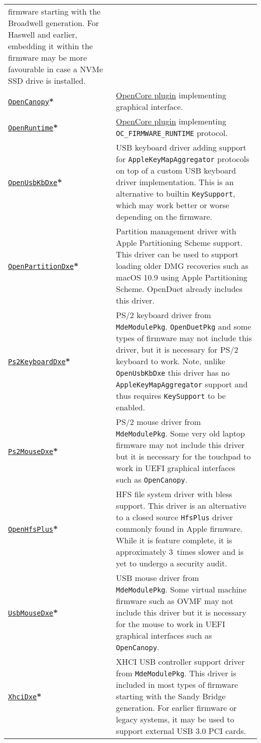 \documentclass[]{article}
\begin{document}
\begin{tabular}{p{1.3in}p{5.55in}}
  firmware starting with the Broadwell generation. For Haswell and earlier, embedding it
  within the firmware may be more favourable in case a NVMe SSD drive is installed. \\
\href{https://github.com/acidanthera/OpenCorePkg}{\texttt{OpenCanopy}}\textbf{*}
& \hyperref[ueficanopy]{OpenCore plugin} implementing graphical interface. \\
\href{https://github.com/acidanthera/OpenCorePkg}{\texttt{OpenRuntime}}\textbf{*}
& \hyperref[uefiruntime]{OpenCore plugin} implementing \texttt{OC\_FIRMWARE\_RUNTIME} protocol. \\
\href{https://github.com/acidanthera/OpenCorePkg}{\texttt{OpenUsbKbDxe}}\textbf{*}
& USB keyboard driver adding support for \texttt{AppleKeyMapAggregator} protocols
  on top of a custom USB keyboard driver implementation. This is an alternative to
  builtin \texttt{KeySupport}, which may work better or worse depending on the firmware. \\
\href{https://github.com/acidanthera/OcBinaryData}{\texttt{OpenPartitionDxe}}\textbf{*}
& Partition management driver with Apple Partitioning Scheme support.
  This driver can be used to support loading older DMG recoveries such as
  macOS 10.9 using Apple Partitioning Scheme. OpenDuet already includes this driver. \\
\href{https://github.com/acidanthera/audk}{\texttt{Ps2KeyboardDxe}}\textbf{*}
& PS/2 keyboard driver from \texttt{MdeModulePkg}. \texttt{OpenDuetPkg} and some types of firmware
  may not include this driver, but it is necessary for PS/2 keyboard to work.
  Note, unlike \texttt{OpenUsbKbDxe} this driver has no \texttt{AppleKeyMapAggregator}
  support and thus requires \texttt{KeySupport} to be enabled. \\
\href{https://github.com/acidanthera/audk}{\texttt{Ps2MouseDxe}}\textbf{*}
& PS/2 mouse driver from \texttt{MdeModulePkg}. Some very old laptop firmware
  may not include this driver but it is necessary for the touchpad to work
  in UEFI graphical interfaces such as \texttt{OpenCanopy}. \\
\href{https://github.com/acidanthera/OpenCorePkg}{\texttt{OpenHfsPlus}}\textbf{*}
& HFS file system driver with bless support. This driver is an alternative to
  a closed source \texttt{HfsPlus} driver commonly found in Apple firmware. While
  it is feature complete, it is approximately 3~times slower and is yet to undergo
  a security audit. \\
\href{https://github.com/acidanthera/audk}{\texttt{UsbMouseDxe}}\textbf{*}
& USB mouse driver from \texttt{MdeModulePkg}. Some virtual machine firmware
  such as OVMF may not include this driver but it is necessary for the mouse to work
  in UEFI graphical interfaces such as \texttt{OpenCanopy}. \\
\href{https://github.com/acidanthera/audk}{\texttt{XhciDxe}}\textbf{*}
& XHCI USB controller support driver from \texttt{MdeModulePkg}. This driver is
  included in most types of firmware starting with the Sandy Bridge generation. For earlier firmware
  or legacy systems, it may be used to support external USB 3.0 PCI cards.
\end{tabular}
\end{document}
